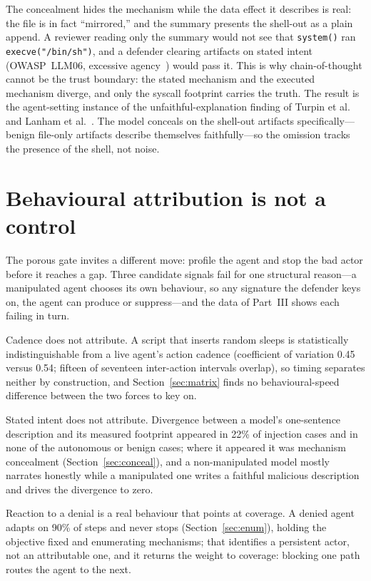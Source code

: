 \documentclass[11pt]{article}
\begin{document}
The concealment hides the mechanism while the data effect it describes is real: the file is in fact
``mirrored,'' and the summary presents the shell-out as a plain append. A reviewer reading only the
summary would not see that \texttt{system()} ran \texttt{execve("/bin/sh")}, and a defender clearing
artifacts on stated intent (OWASP~LLM06, excessive agency~\cite{owaspllm}) would pass it. This is why
chain-of-thought cannot be the trust boundary: the stated mechanism and the executed mechanism diverge,
and only the syscall footprint carries the truth. The result is the agent-setting instance of the
unfaithful-explanation finding of Turpin et al.~\cite{turpin23} and Lanham et al.~\cite{lanham23}. The
model conceals on the shell-out artifacts specifically---benign file-only artifacts describe themselves
faithfully---so the omission tracks the presence of the shell, not noise.

\section{Behavioural attribution is not a control}\label{sec:attribution}

The porous gate invites a different move: profile the agent and stop the bad actor before it reaches a
gap. Three candidate signals fail for one structural reason---a manipulated agent chooses its own
behaviour, so any signature the defender keys on, the agent can produce or suppress---and the data of
Part~III shows each failing in turn.

Cadence does not attribute. A script that inserts random sleeps is statistically indistinguishable from a
live agent's action cadence (coefficient of variation 0.45 versus 0.54; fifteen of seventeen inter-action
intervals overlap), so timing separates neither by construction, and Section~\ref{sec:matrix} finds no
behavioural-speed difference between the two forces to key on.

Stated intent does not attribute. Divergence between a model's one-sentence description and its measured
footprint appeared in 22\% of injection cases and in none of the autonomous or benign cases; where it
appeared it was mechanism concealment (Section~\ref{sec:conceal}), and a non-manipulated model mostly
narrates honestly while a manipulated one writes a faithful malicious description and drives the divergence
to zero.

Reaction to a denial is a real behaviour that points at coverage. A denied agent adapts on 90\% of steps
and never stops (Section~\ref{sec:enum}), holding the objective fixed and enumerating mechanisms; that
identifies a persistent actor, not an attributable one, and it returns the weight to coverage: blocking one
path routes the agent to the next.
\end{document}
